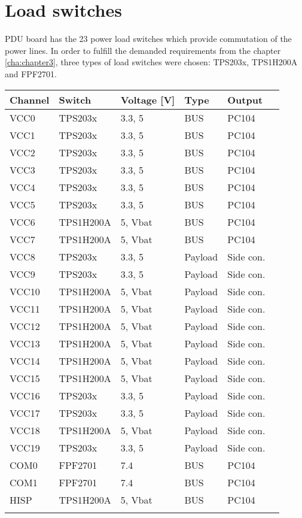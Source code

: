 \section{Load switches}
PDU board has the 23 power load switches which provide commutation of the power lines. In order to fulfill the demanded requirements from the chapter \ref{cha:chapter3}, three types of load switches were chosen: TPS203x, TPS1H200A and FPF2701. 
\begin{tabular}{p{2cm}p{2cm}p{2cm}p{2cm}p{2cm}p{2cm}} \toprule
	Channel & Switch  & Voltage [V] & Type & Output\\ \midrule
	VCC0 & TPS203x & 3.3, 5 & BUS & PC104\\
	VCC1 & TPS203x & 3.3, 5 & BUS & PC104\\
	VCC2 & TPS203x & 3.3, 5 & BUS & PC104\\
	VCC3 & TPS203x & 3.3, 5 & BUS & PC104\\
	VCC4 & TPS203x & 3.3, 5 & BUS & PC104\\
    VCC5 & TPS203x & 3.3, 5 & BUS & PC104\\
    VCC6 & TPS1H200A & 5, Vbat & BUS & PC104\\
    VCC7 & TPS1H200A & 5, Vbat & BUS & PC104\\
    VCC8 & TPS203x & 3.3, 5 & Payload & Side con.\\
    VCC9 & TPS203x & 3.3, 5 & Payload & Side con.\\
    VCC10 & TPS1H200A & 5, Vbat & Payload & Side con.\\
    VCC11 & TPS1H200A & 5, Vbat & Payload & Side con.\\
    VCC12 & TPS1H200A & 5, Vbat & Payload & Side con.\\
    VCC13 & TPS1H200A & 5, Vbat & Payload & Side con.\\
    VCC14 & TPS1H200A & 5, Vbat & Payload & Side con.\\
    VCC15 & TPS1H200A & 5, Vbat & Payload & Side con.\\
    VCC16 & TPS203x & 3.3, 5 & Payload & Side con.\\
    VCC17 & TPS203x & 3.3, 5 & Payload & Side con.\\
    VCC18 & TPS1H200A & 5, Vbat & Payload & Side con.\\
    VCC19 & TPS203x & 3.3, 5 & Payload & Side con.\\
    COM0 & FPF2701 & 7.4 & BUS & PC104\\
    COM1 & FPF2701 & 7.4 & BUS & PC104\\
    HISP & TPS1H200A & 5, Vbat & BUS & PC104\\ \\
	\bottomrule
	
\end{tabular}\\ \\ \\ \\

